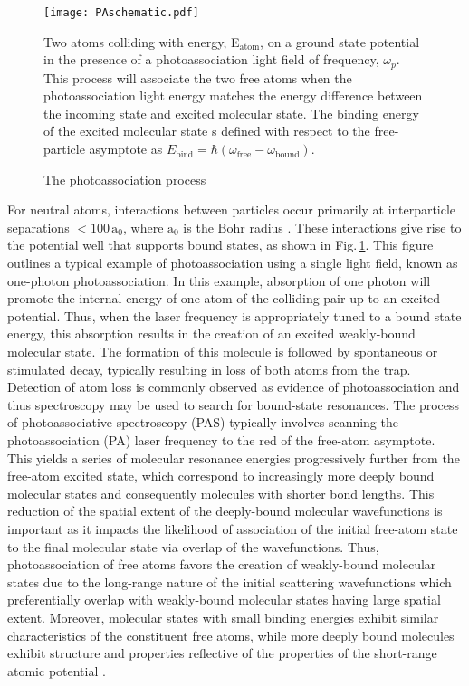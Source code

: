 	\begin{figure} 
		\centerline{
		\texttt{[image: PAschematic.pdf]}}
		\caption{The photoassociation process}{Two atoms colliding with energy, E$_\text{atom}$, on a ground state potential in the presence of a photoassociation light field of frequency, $\omega_p$. This process will associate the two free atoms when the photoassociation light energy matches the energy difference between the incoming state and excited molecular state. The binding energy of the excited molecular state s defined with respect to the free-particle asymptote as $E_\text{bind} = \hbar (\omega_\text{free} - \omega_\text{bound})$.}
		\label{fig:1pasSch}
	\end{figure}
For neutral atoms, interactions between particles occur primarily at interparticle separations $<\!100\,\text{a}_0$, where $\text{a}_0$ is the Bohr radius \cite{Chin2010}.
These interactions give rise to the potential well that supports bound states, as shown in Fig.\,\ref{fig:1pasSch}.
This figure outlines a typical example of photoassociation using a single light field, known as one-photon photoassociation.
In this example, absorption of one photon will promote the internal energy of one atom of the colliding pair up to an excited potential.
Thus, when the laser frequency is appropriately tuned to a bound state energy, this absorption results in the creation of an excited weakly-bound molecular state.
The formation of this molecule is followed by spontaneous or stimulated decay, typically resulting in loss of both atoms from the trap.
Detection of atom loss is commonly observed as evidence of photoassociation and thus spectroscopy may be used to search for bound-state resonances.
The process of photoassociative spectroscopy (PAS) typically involves scanning the photoassociation (PA) laser frequency to the red of the free-atom asymptote.
This yields a series of molecular resonance energies progressively further from the free-atom excited state, which correspond to increasingly more deeply bound molecular states and consequently molecules with shorter bond lengths.
This reduction of the spatial extent of the deeply-bound molecular wavefunctions is important as it impacts the likelihood of association of the initial free-atom state to the final molecular state via overlap of the wavefunctions.
Thus, photoassociation of free atoms favors the creation of weakly-bound molecular states due to the long-range nature of the initial scattering wavefunctions which preferentially overlap with weakly-bound molecular states having large spatial extent.
Moreover, molecular states with small binding energies exhibit similar characteristics of the constituent free atoms, while more deeply bound molecules exhibit structure and properties reflective of the properties of the short-range atomic potential \cite{Jones2006}.

